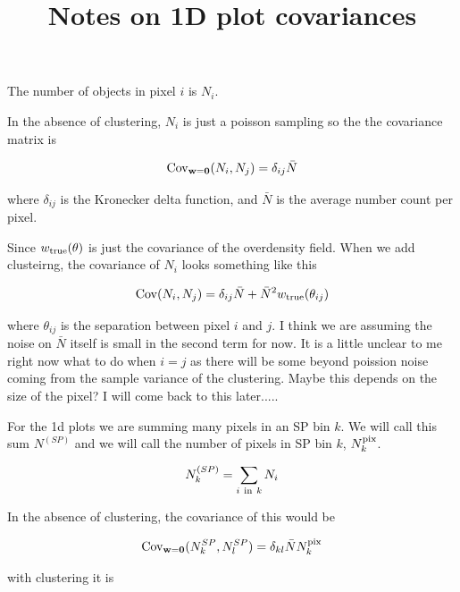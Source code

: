 \documentclass[12pt]{article}
\begin{document}
 
\title{Notes on 1D plot covariances}
\maketitle

The number of objects in pixel $i$ is $N_i$.

In the absence of clustering, $N_i$ is just a poisson sampling so the the covariance matrix is


\begin{equation}
{\bf {\rm Cov}_{w=0}}(N_i,N_j) = \delta_{ij}{\bar N}
\end{equation}

where $\delta_{ij}$ is the Kronecker delta function, and ${\bar N}$ is the average number count per pixel. 

Since $w_{\rm true}(\theta)$ is just the covariance of the overdensity field. When we add clusteirng, the covariance of $N_i$ looks something like this

\begin{equation}
{\bf {\rm Cov}}(N_i,N_j) = \delta_{ij}{\bar N} + {\bar N}^2 w_{\rm true}(\theta_{ij})
\end{equation}

where $\theta_{ij}$ is the separation between pixel $i$ and $j$. I think we are assuming the noise on ${\bar N}$ itself is small in the second term for now. It is a little unclear to me right now what to do when $i=j$ as there will be some beyond poission noise coming from the sample variance of the clustering. Maybe this depends on the size of the pixel? I will come back to this later.....

For the 1d plots we are summing many pixels in an SP bin $k$. We will call this sum $N^{(SP)}$ and we will call the number of pixels in SP bin $k$, $N^{\rm pix}_{k}$.

\begin{equation}
N^{(SP)}_{k} = \sum_{i { \ \rm in \ } k} N_{i}
\end{equation}

In the absence of clustering, the covariance of this would be 

\begin{equation}
{\bf {\rm Cov}_{w=0}}(N^{SP}_k, N^{SP}_l) = \delta_{kl} {\bar N} N^{\rm pix}_{k}
\end{equation}

with clustering it is
\end{document}

